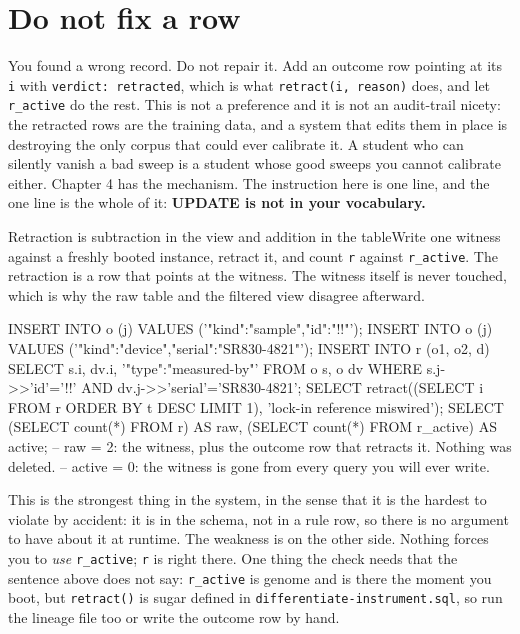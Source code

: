 \section{Do not fix a row}

You found a wrong record. Do not repair it. Add an outcome row pointing at its \texttt{i} with \texttt{verdict: retracted}, which is what \texttt{retract(i, reason)} does, and let \texttt{r\_active} do the rest. This is not a preference and it is not an audit-trail nicety: the retracted rows are the training data, and a system that edits them in place is destroying the only corpus that could ever calibrate it. A student who can silently vanish a bad sweep is a student whose good sweeps you cannot calibrate either. Chapter 4 has the mechanism. The instruction here is one line, and the one line is the whole of it: \textbf{UPDATE is not in your vocabulary.}

\begin{Correspondence}{Retraction is subtraction in the view and addition in the table}{Write one witness against a freshly booted instance, retract it, and count \texttt{r} against \texttt{r\_active}.}
The retraction is a row that points at the witness. The witness itself is never touched, which is why the raw table and the filtered view disagree afterward.
\begin{Check}
INSERT INTO o (j) VALUES ('{"kind":"sample","id":"!\labSample!"}');
INSERT INTO o (j) VALUES ('{"kind":"device","serial":"SR830-4821"}');
INSERT INTO r (o1, o2, d)
  SELECT s.i, dv.i, '{"type":"measured-by"}'
  FROM o s, o dv
  WHERE s.j->>'id'='!\labSample!' AND dv.j->>'serial'='SR830-4821';
SELECT retract((SELECT i FROM r ORDER BY t DESC LIMIT 1), 'lock-in reference miswired');
SELECT (SELECT count(*) FROM r) AS raw,
       (SELECT count(*) FROM r_active) AS active;
-- raw = 2: the witness, plus the outcome row that retracts it. Nothing was deleted.
-- active = 0: the witness is gone from every query you will ever write.
\end{Check}
This is the strongest thing in the system, in the sense that it is the hardest to violate by accident: it is in the schema, not in a rule row, so there is no argument to have about it at runtime. The weakness is on the other side. Nothing forces you to \emph{use} \texttt{r\_active}; \texttt{r} is right there. One thing the check needs that the sentence above does not say: \texttt{r\_active} is genome and is there the moment you boot, but \texttt{retract()} is sugar defined in \texttt{differentiate-instrument.sql}, so run the lineage file too or write the outcome row by hand.
\end{Correspondence}

